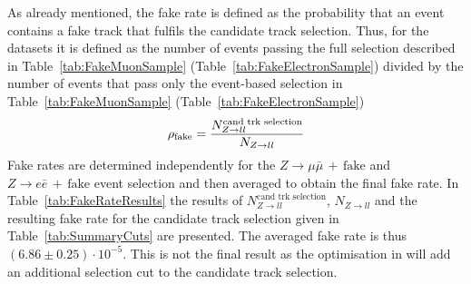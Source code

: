 As already mentioned, the fake rate is defined as the probability that an event contains a fake track that fulfils the candidate track selection.
Thus, for the \Zlep datasets it is defined as the number of events passing the full selection described in Table~\ref{tab:FakeMuonSample} (Table~\ref{tab:FakeElectronSample}) divided by the number of events that pass only the event-based selection in Table~\ref{tab:FakeMuonSample} (Table~\ref{tab:FakeElectronSample})
\begin{equation}
\rho_{\text{fake}} = \frac{N_{Z\rightarrow ll}^{\text{cand trk selection}}}{N_{Z\rightarrow ll}}
\end{equation}
Fake rates are determined independently for the $Z\rightarrow \mu\bar{\mu}\,+\,\text{fake}$ and $Z\rightarrow e\bar{e}\,+\,\text{fake}$ event selection and then averaged to obtain the final fake rate. 
In Table~\ref{tab:FakeRateResults} the results of $N_{Z\rightarrow ll}^{\text{cand trk selection}}$, $N_{Z\rightarrow ll}$ and the resulting fake rate for the candidate track selection given in Table~\ref{tab:SummaryCuts} are presented.
The averaged fake rate is thus $\left( 6.86 \pm 0.25 \right) \cdot 10^{-5}$.
This is not the final result as the optimisation in \pt will add an additional \pt selection cut to the candidate track selection.

\renewcommand{\arraystretch}{1.5}
\begin{table}[!b]
\centering
\caption{Results of $N_{Z\rightarrow ll}^{\text{cand trk selection}}$, $N_{Z\rightarrow ll}$ and \fakerate for the $Z\rightarrow \mu\bar{\mu}\,+\,\text{fake}$ (Table~\ref{tab:FakeMuonSample}) and $Z\rightarrow e\bar{e}\,+\,\text{fake}$ (Table~\ref{tab:FakeElectronSample}) selection.}
\label{tab:FakeRateResults}
\end{table}  


